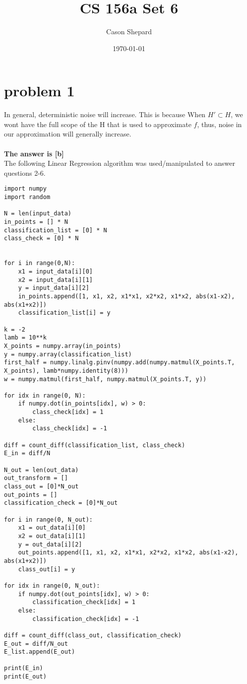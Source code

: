 \documentclass{article}
\title{CS 156a Set 6}
\author{Cason Shepard}
\date\today
\begin{document}
\maketitle

\section*{problem 1}
In general, deterministic noise will increase. This is because When $H' \subset H$, we wont have the full scope of the H that is used to approximate $f$, thus, noise in our approximation will generally increase.\\\\
\textbf{The answer is [b]}\\

{\Large The following Linear Regression algorithm was used/manipulated to answer questions 2-6.}
\begin{verbatim}
import numpy
import random

N = len(input_data)
in_points = [] * N
classification_list = [0] * N
class_check = [0] * N


for i in range(0,N):
    x1 = input_data[i][0]
    x2 = input_data[i][1]
    y = input_data[i][2]
    in_points.append([1, x1, x2, x1*x1, x2*x2, x1*x2, abs(x1-x2), abs(x1+x2)])
    classification_list[i] = y

k = -2
lamb = 10**k
X_points = numpy.array(in_points)
y = numpy.array(classification_list)
first_half = numpy.linalg.pinv(numpy.add(numpy.matmul(X_points.T, X_points), lamb*numpy.identity(8)))
w = numpy.matmul(first_half, numpy.matmul(X_points.T, y))

for idx in range(0, N):
    if numpy.dot(in_points[idx], w) > 0:
        class_check[idx] = 1
    else:
        class_check[idx] = -1

diff = count_diff(classification_list, class_check)
E_in = diff/N

N_out = len(out_data)
out_transform = []
class_out = [0]*N_out
out_points = []
classification_check = [0]*N_out
    
for i in range(0, N_out):
    x1 = out_data[i][0]
    x2 = out_data[i][1]
    y = out_data[i][2]
    out_points.append([1, x1, x2, x1*x1, x2*x2, x1*x2, abs(x1-x2), abs(x1+x2)])
    class_out[i] = y

for idx in range(0, N_out):
    if numpy.dot(out_points[idx], w) > 0:
        classification_check[idx] = 1
    else:
        classification_check[idx] = -1

diff = count_diff(class_out, classification_check)
E_out = diff/N_out
E_list.append(E_out)

print(E_in)
print(E_out)
\end{verbatim}
\text
\end{document}
